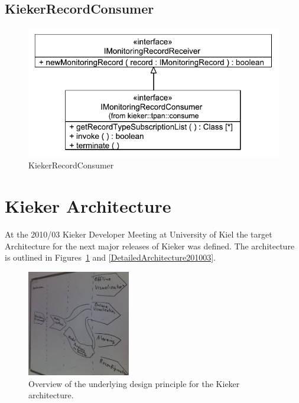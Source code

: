 \documentclass[12pt,journal,a4paper,twocolumn,final,oneside]{IEEEtran}%
\begin{document}
\subsection{KiekerRecordConsumer}

\begin{figure}[h]\centering
\includegraphics[scale=0.55]{figures/model/kieker_recordConsumer}%
\caption{KiekerRecordConsumer}
\end{figure}

\clearpage

\appendix

\section{Kieker Architecture}

At the 2010/03 Kieker Developer Meeting at University of Kiel the target Architecture for the next major releases of Kieker was defined. The architecture is outlined in Figures~\ref{OverviewArchitecture201003} and \ref{DetailedArchitecture201003}.

\begin{figure}
 \centering
 \includegraphics[width=0.4\textwidth]{./figures/2010-03-09-TargetArchitectureOverview.jpg}
 \caption{Overview of the underlying design principle for the Kieker architecture.}\label{OverviewArchitecture201003}
\end{figure}
\end{document}
